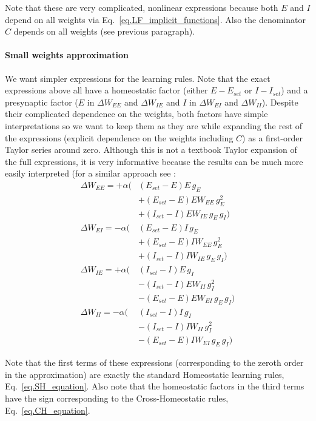 \documentclass[
twocolumn,
]{article}
\newcommand{\EE}{\mathit{EE}}
\newcommand{\EI}{\mathit{EI}}
\newcommand{\IE}{\mathit{IE}}
\newcommand{\II}{\mathit{II}}
\newcommand{\set}{\mathit{set}}
\begin{document}
\noindent Note that these are very complicated, nonlinear expressions because both $E$ and $I$ depend on all weights via Eq.\ \ref{eq.LF_implicit_functions}. Also the denominator $C$ depends on all weights (see previous paragraph).


\paragraph{Small weights approximation}

We want simpler expressions for the learning rules. Note that the exact expressions above all have a homeostatic factor (either $E - E_{\set}$ or $I - I_{\set}$) and a presynaptic factor ($E$ in $\Delta W_{\EE}$ and $\Delta W_{\IE}$ and $I$ in $\Delta W_{\EI}$ and $\Delta W_{\II}$). Despite their complicated dependence on the weights, both factors have simple interpretations so we want to keep them as they are while expanding the rest of the expressions (explicit dependence on the weights including $C$) as a first-order Taylor series around zero. Although this is not a textbook Taylor expansion of the full expressions, it is very informative because the results can be much more easily interpreted (for a similar approach see \cite{Mackwood2020}:
\begin{equation}
\begin{aligned}
\Delta W_{\EE} = + \alpha( & (E_{\set} - E)E \, g_E \\
& + (E_{\set} - E)E W_{\EE} \, g_E^2 \\
& + (I_{\set} - I)E W_{\IE} \, g_E \, g_I) \\
\Delta W_{\EI} = - \alpha( & (E_{\set} - E)I \, g_E \\
& + (E_{\set} - E)I W_{\EE} \, g_E^2 \\
& + (I_{\set} - I)I W_{\IE} \, g_E \, g_I) \\
\Delta W_{\IE} = + \alpha( & (I_{\set} - I)E \, g_I \\
& - (I_{\set} - I)E W_{\II} \, g_I^2 \\
& - (E_{\set} - E)E W_{\EI} \, g_E \, g_I) \\
\Delta W_{\II} = - \alpha( & (I_{\set} - I)I \, g_I \\
& - (I_{\set} - I)I W_{\II} \, g_I^2 \\
& - (E_{\set} - E)I W_{\EI} \, g_E \, g_I)
\end{aligned}
\label{eq.LF_smallweights}
\end{equation}

\noindent Note that the first terms of these expressions (corresponding to the zeroth order in the approximation) are exactly the standard Homeostatic learning rules, Eq.\ \ref{eq.SH_equation}. Also note that the homeostatic factors in the third terms have the sign corresponding to the Cross-Homeostatic rules, Eq.\ \ref{eq.CH_equation}.



%
\printbibliography
\end{document}
